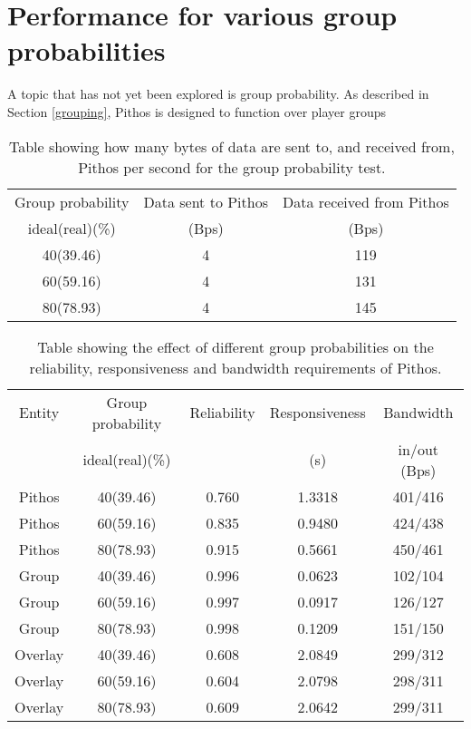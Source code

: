 \section{Performance for various group probabilities}

A topic that has not yet been explored is group probability. As described in Section \ref{grouping}, Pithos is designed to function over player groups

\begin{table}[htbp]
\centering
\begin{tabular}{|c|c|c|}
\hline
Group probability& Data sent to Pithos   & Data received from Pithos\\
 ideal(real)(\%) &  (Bps)                &          (Bps)           \\
\hline
   40(39.46)     &       4               &          119             \\
   60(59.16)     &       4               &          131             \\
   80(78.93)     &       4               &          145              \\
\hline
\end{tabular}
\caption{Table showing how many bytes of data are sent to, and received from, Pithos per second for the group probability test.}
\label{tab_higher_data_results}
\end{table}


\begin{table}[htbp]
\centering
\begin{tabular}{|c|c|c|c|c|}
\hline
Entity&Group probability&Reliability&Responsiveness&Bandwidth   \\
      & ideal(real)(\%) &           &     (s)      &in/out (Bps)\\
\hline
Pithos & 40(39.46)      &  0.760    & 1.3318       &   401/416  \\
Pithos & 60(59.16)      &  0.835    & 0.9480       &   424/438  \\
Pithos & 80(78.93)      &  0.915    & 0.5661       &   450/461  \\
\hline
Group & 40(39.46)       &  0.996    &   0.0623     &   102/104  \\
Group & 60(59.16)       &  0.997    &   0.0917     &   126/127  \\
Group & 80(78.93)       &  0.998    &   0.1209     &   151/150  \\
\hline
Overlay & 40(39.46)     &  0.608     &   2.0849     &   299/312  \\
Overlay & 60(59.16)     &  0.604     &   2.0798     &   298/311  \\
Overlay & 80(78.93)     &  0.609     &   2.0642     &   299/311  \\
\hline
\end{tabular}
\caption{Table showing the effect of different group probabilities on the reliability, responsiveness and bandwidth requirements of Pithos.}
\label{tab_group_prob_results}
\end{table}

